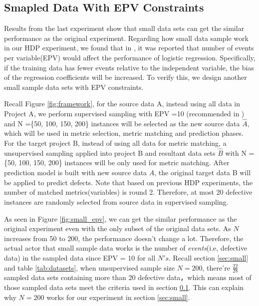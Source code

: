 \subsection{Smapled Data With EPV Constraints}
\label{sec:EPV}
 Results from the last experiment show that small data sets can get the similar performance as the original experiment. Regarding how small data sample work in our HDP experiment,  we found that in \cite{peduzzi1996simulation}, it was reported that number of events per variable(EPV) would affect the performance of logistic regression. Specifically, if the training data has fewer events relative to the independent variable, the bias of the regression coefficients will be increased. To verify this, we design another small sample data sets with EPV constraints.

Recall Figure \ref{fig:framework}, for the source data A, instead using all data in Project A, we perform supervised sampling with EPV =10 (recommended in \cite{peduzzi1996simulation})  and N =\{50, 100, 150, 200\} instances will be selected as the new source data ${\hat A}$, which will be used in metric selection, metric matching and prediction phases. For the target project B, instead of using all data for metric matching, a unsupervised sampling applied into project B and resultant data sets ${\hat B}$ with N = \{50, 100, 150, 200\} instances will be only used for metric matching. After prediction model is built with new source data $\hat A$, the original target data B will be applied to predict defects. Note that based on previous HDP experiments, the number of matched metrics(variables) is round 2. Therefore, at most 20 defective instances are randomly selected from source data in supervised sampling.

As seen in Figure \ref{fig:small_epv}, we can get the similar performance as the original experiment even with the only subset of the original data sets. As $N$ increases from 50 to 200, the performance doesn't change a lot. Therefore, the actual actor that small sample data works is the number of {\it events}(i.e, defective data) in the sampled data since EPV = 10 for all $N's$. Recall section \ref{sec:small} and table \ref{tab:datasets}, when unsupervised sample size $N=200$, there're $\frac{22}{28}$ sampled data sets containing more than 20 defective data，which means most of those sampled data sets meet the criteria used in section \ref{sec:EPV}. This can explain why $N=200$ works for our experiment in section \ref{sec:small}.





